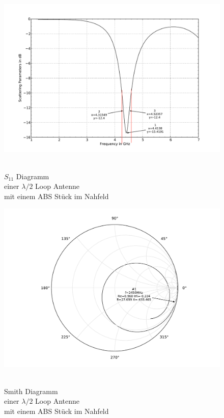 \begin{figure}[!h]
\begin{center}
  \includegraphics[width=\linewidth]{content/bilder/Evaluation/Loop/L2/1ABS/S11_Loop_Lambda2_mitABS.pdf}
  \caption{\\$S_{11}$ Diagramm \\einer $\lambda/2$ Loop Antenne \\mit einem ABS Stück im Nahfeld}\label{fig:S11_Lambda2_Loop_1ABS_3}
\endminipage%
{}
  \includegraphics[width=\linewidth]{content/bilder/Evaluation/Loop/L2/1ABS/Smith_Loop_Lambda2_mitABS.pdf}
  \caption{\\Smith Diagramm \\einer $\lambda/2$ Loop Antenne \\ mit einem ABS Stück im Nahfeld}\label{fig:Smith_Lambda2_Loop_1ABS_4}
\endminipage
\end{center}
\end{figure}
